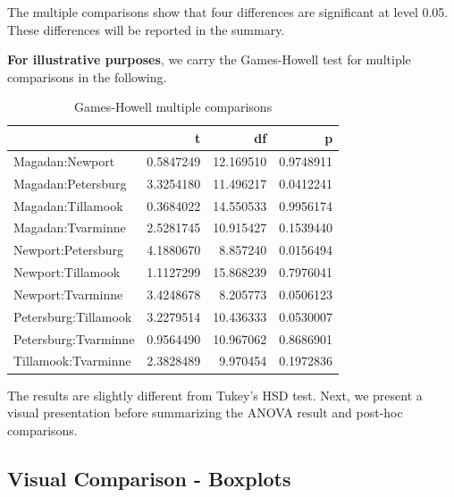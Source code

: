 \documentclass[
]{book}
\newenvironment{Shaded}{\begin{snugshade}}{\end{snugshade}}
\newcommand{\AttributeTok}[1]{\textcolor[rgb]{0.13,0.29,0.53}{#1}}
\newcommand{\FunctionTok}[1]{\textcolor[rgb]{0.13,0.29,0.53}{\textbf{#1}}}
\newcommand{\NormalTok}[1]{#1}
\newcommand{\OtherTok}[1]{\textcolor[rgb]{0.56,0.35,0.01}{#1}}
\newcommand{\SpecialCharTok}[1]{\textcolor[rgb]{0.81,0.36,0.00}{\textbf{#1}}}
\newcommand{\StringTok}[1]{\textcolor[rgb]{0.31,0.60,0.02}{#1}}
\begin{document}
The multiple comparisons show that four differences are significant at level 0.05. These differences will be reported in the summary.

\textbf{For illustrative purposes}, we carry the Games-Howell test for multiple comparisons in the following.

\begin{Shaded}
\end{Shaded}

\begin{table}

\caption{\label{tab:unnamed-chunk-132}Games-Howell multiple comparisons}
\centering
\begin{tabular}[t]{l|r|r|r}
\hline
  & t & df & p\\
\hline
Magadan:Newport & 0.5847249 & 12.169510 & 0.9748911\\
\hline
Magadan:Petersburg & 3.3254180 & 11.496217 & 0.0412241\\
\hline
Magadan:Tillamook & 0.3684022 & 14.550533 & 0.9956174\\
\hline
Magadan:Tvarminne & 2.5281745 & 10.915427 & 0.1539440\\
\hline
Newport:Petersburg & 4.1880670 & 8.857240 & 0.0156494\\
\hline
Newport:Tillamook & 1.1127299 & 15.868239 & 0.7976041\\
\hline
Newport:Tvarminne & 3.4248678 & 8.205773 & 0.0506123\\
\hline
Petersburg:Tillamook & 3.2279514 & 10.436333 & 0.0530007\\
\hline
Petersburg:Tvarminne & 0.9564490 & 10.967062 & 0.8686901\\
\hline
Tillamook:Tvarminne & 2.3828489 & 9.970454 & 0.1972836\\
\hline
\end{tabular}
\end{table}

The results are slightly different from Tukey's HSD test. Next, we present a visual presentation before summarizing the ANOVA result and post-hoc comparisons.

\hypertarget{visual-comparison---boxplots}{%
\subsection{Visual Comparison - Boxplots}\label{visual-comparison---boxplots}}
\end{document}
